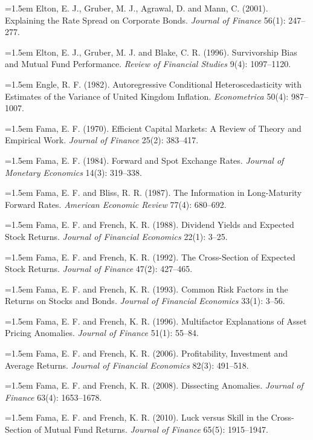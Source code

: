 \hangindent=1.5em Elton, E. J., Gruber, M. J., Agrawal, D. and Mann, C. (2001). Explaining the Rate Spread on Corporate Bonds. \emph{Journal of Finance} 56(1): 247--277.

\hangindent=1.5em Elton, E. J., Gruber, M. J. and Blake, C. R. (1996). Survivorship Bias and Mutual Fund Performance. \emph{Review of Financial Studies} 9(4): 1097--1120.

\hangindent=1.5em Engle, R. F. (1982). Autoregressive Conditional Heteroscedasticity with Estimates of the Variance of United Kingdom Inflation. \emph{Econometrica} 50(4): 987--1007.

\hangindent=1.5em Fama, E. F. (1970). Efficient Capital Markets: A Review of Theory and Empirical Work. \emph{Journal of Finance} 25(2): 383--417.

\hangindent=1.5em Fama, E. F. (1984). Forward and Spot Exchange Rates. \emph{Journal of Monetary Economics} 14(3): 319--338.

\hangindent=1.5em Fama, E. F. and Bliss, R. R. (1987). The Information in Long-Maturity Forward Rates. \emph{American Economic Review} 77(4): 680--692.

\hangindent=1.5em Fama, E. F. and French, K. R. (1988). Dividend Yields and Expected Stock Returns. \emph{Journal of Financial Economics} 22(1): 3--25.

\hangindent=1.5em Fama, E. F. and French, K. R. (1992). The Cross-Section of Expected Stock Returns. \emph{Journal of Finance} 47(2): 427--465.

\hangindent=1.5em Fama, E. F. and French, K. R. (1993). Common Risk Factors in the Returns on Stocks and Bonds. \emph{Journal of Financial Economics} 33(1): 3--56.

\hangindent=1.5em Fama, E. F. and French, K. R. (1996). Multifactor Explanations of Asset Pricing Anomalies. \emph{Journal of Finance} 51(1): 55--84.

\hangindent=1.5em Fama, E. F. and French, K. R. (2006). Profitability, Investment and Average Returns. \emph{Journal of Financial Economics} 82(3): 491--518.

\hangindent=1.5em Fama, E. F. and French, K. R. (2008). Dissecting Anomalies. \emph{Journal of Finance} 63(4): 1653--1678.

\hangindent=1.5em Fama, E. F. and French, K. R. (2010). Luck versus Skill in the Cross-Section of Mutual Fund Returns. \emph{Journal of Finance} 65(5): 1915--1947.

